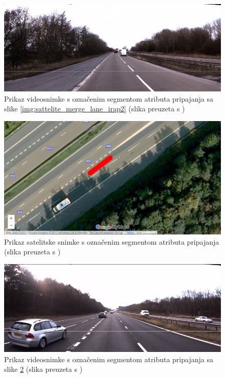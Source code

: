 \documentclass[times, utf8, diplomski, numeric]{fer}
\begin{document}
\begin{figure}[H]
\centering
\includegraphics[scale=0.5]{images/video_merge_lane_irap2.png}
\caption{Prikaz videosnimke s označenim segmentom atributa pripajanja sa slike \ref{img:sattelite_merge_lane_irap2} (slika preuzeta s \citep{url:ftts_irap})}
\label{img:video_merge_lane_irap2}
\end{figure}

\begin{figure}[H]
\centering
\includegraphics[scale=0.35]{images/sattelite_merge_lane_irap3.png}
\caption{Prikaz satelitske snimke s označenim segmentom atributa pripajanja (slika preuzeta s \citep{url:google_maps})}
\label{img:sattelite_merge_lane_irap3}
\end{figure}

\begin{figure}[H]
\centering
\includegraphics[scale=0.5]{images/video_merge_lane_irap3.png}
\caption{Prikaz videosnimke s označenim segmentom atributa pripajanja sa slike \ref{img:sattelite_merge_lane_irap3} (slika preuzeta s \citep{url:ftts_irap})}
\label{img:video_merge_lane_irap3}
\end{figure}
\end{document}
